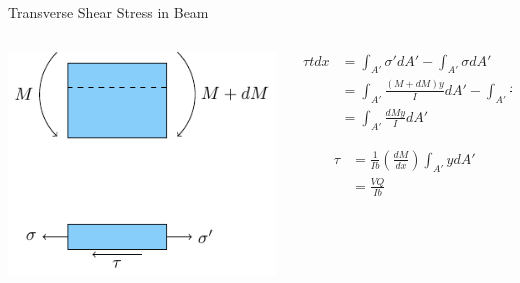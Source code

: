 \documentclass[10pt, svgnames]{beamer}
\begin{document}
\begin{frame}[label={sec:org55880ee}]{Transverse Shear Stress in Beam}
\begin{columns}
\begin{column}{0.5\columnwidth}
\begin{center}
\includegraphics[width=.9\linewidth]{pictures/shear-in-beam.pdf}
\end{center}
\end{column}

\begin{column}{0.5\columnwidth}
\begin{align*}
  \tau t dx &= \int_{A'} \sigma' dA' - \int_{A'} \sigma dA' \\
            &= \int_{A'} \frac{ (M + dM)y }{I} dA' - \int_{A'} \frac{My}{I} dA' \\
            &= \int_{A'} \frac{dMy}{I} dA'
\end{align*}

\begin{align*}
  \tau &= \frac{1}{Ib} \left( \frac{dM}{dx} \right) \int_{A'} y dA' \\
       &= \frac{VQ}{Ib}
\end{align*}
\end{column}
\end{columns}
\end{frame}
\end{document}
